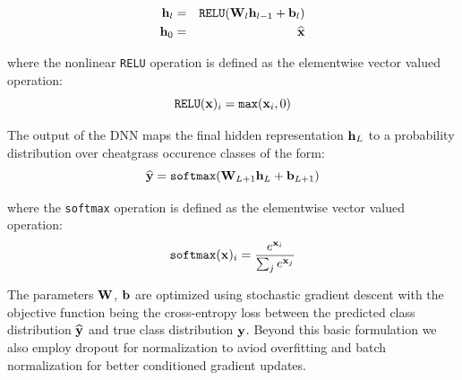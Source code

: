 \def\year{2017}\relax \documentclass[letterpaper]{article}
\begin{document}
\begin{eqnarray}
{\bf h}_l &= &\texttt{RELU}({\bf W}_l {\bf h}_{l-1} + {\bf b}_l)\\
{\bf h}_0&=&\widehat{{\bf x}}
\end{eqnarray}

where the nonlinear \texttt{RELU} operation is defined as the elementwise vector valued operation:
\begin{equation}
\texttt{RELU}({\bf x})_i = \texttt{max}({\bf x}_i, 0)
\end{equation}


The output of the DNN maps the final hidden representation ${\bf h}_L$ to a probability distribution over cheatgrass occurence classes of the form:
\begin{equation}
\widehat{{\bf y}} = \texttt{softmax}({\bf W}_{L+1}{\bf h}_L + {\bf b}_{L+1})
\end{equation}

where the \texttt{softmax} operation is defined as the elementwise vector valued operation:
\begin{equation}
\texttt{softmax}({\bf x})_i = \frac{e^{{\bf x}_i}}{\sum_{j}e^{{\bf x}_j}}
\end{equation}

The parameters ${\bf W}$, ${\bf b}$ are optimized using stochastic gradient descent with the objective function being the cross-entropy loss between the predicted class distribution $\widehat{{\bf y}}$ and true class distribution ${\bf y}$. Beyond this basic formulation we also employ dropout for normalization to aviod overfitting and batch normalization for better conditioned gradient updates. 
\end{document}
